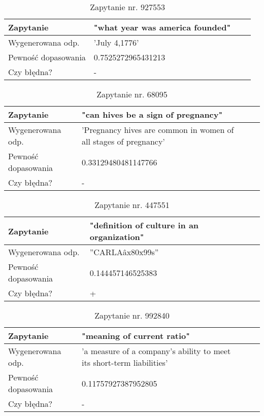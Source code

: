  \begin{table}[htp!]
\centering
\caption{Zapytanie nr. 927553}
\vspace*{5mm}
\begin{tabular}{llll}
   Zapytanie & "what year was america founded"\\
   \hline
    Wygenerowana odp. & 'July 4,1776' \\
    \hline
    Pewność dopasowania & 0.7525272965431213\\
    \hline
    Czy błędna? & -\\
\end{tabular}
\end{table}

 \begin{table}[htp!]
\centering
\caption{Zapytanie nr. 68095}
\vspace*{5mm}
\begin{tabular}{llll}
   Zapytanie & "can hives be a sign of pregnancy"\\
   \hline
    Wygenerowana odp. & 'Pregnancy hives are common in women of all stages of pregnancy' \\
    \hline
    Pewność dopasowania &0.33129480481147766\\
    \hline
    Czy błędna? & -\\
\end{tabular}
\end{table}

 \begin{table}[htp!]
\centering
\caption{Zapytanie nr. 447551}
\vspace*{5mm}
\begin{tabular}{llll}
   Zapytanie & "definition of culture in an organization"\\
   \hline
    Wygenerowana odp. & ''CARLAâx80x99s'' \\
    \hline
    Pewność dopasowania & 0.144457146525383\\
    \hline
    Czy błędna? & +\\
\end{tabular}
\end{table}

 \begin{table}[htp!]
\centering
\caption{Zapytanie nr. 992840}
\vspace*{5mm}
\begin{tabular}{llll}
   Zapytanie & "meaning of current ratio"\\
   \hline
    Wygenerowana odp. & 'a measure of a company's ability to meet its short-term liabilities' \\
    \hline
    Pewność dopasowania & 0.11757927387952805\\
    \hline
    Czy błędna? & -\\
\end{tabular}
\end{table}

